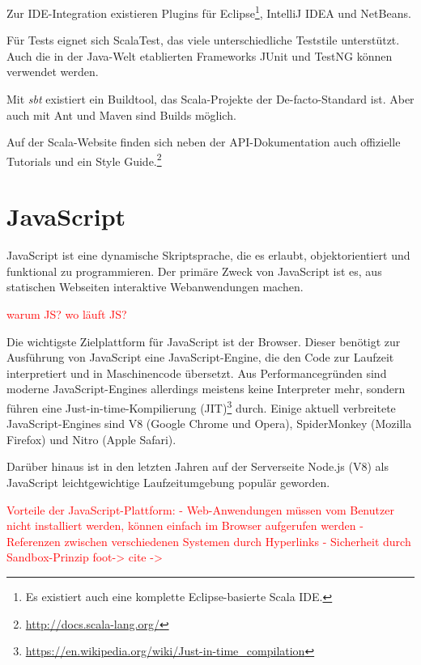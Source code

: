 \documentclass[a4paper, 12pt, hidelinks, listof=totoc, listoftables=totoc, bibliography=totoc]{scrreprt}
\newcommand{\TODO}[1]{\textcolor{red}{#1}\newline}
\begin{document}
Zur IDE-Integration existieren Plugins für Eclipse\footnote{Es existiert auch eine komplette Eclipse-basierte Scala IDE.}, IntelliJ IDEA und NetBeans.

Für Tests eignet sich ScalaTest, das viele unterschiedliche Teststile unterstützt. Auch die in der Java-Welt etablierten Frameworks JUnit und TestNG können verwendet werden.

Mit \textit{sbt} existiert ein Buildtool, das Scala-Projekte der De-facto-Standard ist. Aber auch mit Ant und Maven sind Builds möglich.

Auf der Scala-Website finden sich neben der API-Dokumentation auch offizielle Tutorials und ein Style Guide.\footnote{\url{http://docs.scala-lang.org/}}



\section{JavaScript}

JavaScript ist eine dynamische Skriptsprache, die es erlaubt, objektorientiert und funktional zu programmieren. Der primäre Zweck von JavaScript ist es, aus statischen Webseiten interaktive Webanwendungen machen\cite[S. 361]{flanagan2011.JDG}.

\TODO{warum JS?}
\TODO{wo läuft JS?}

Die wichtigste Zielplattform für JavaScript ist der Browser. Dieser benötigt zur Ausführung von JavaScript eine JavaScript-Engine, die den Code zur Laufzeit interpretiert und in Maschinencode übersetzt. Aus Performancegründen sind moderne JavaScript-Engines allerdings meistens keine Interpreter mehr, sondern führen eine Just-in-time-Kompilierung (JIT)\footnote{\url{https://en.wikipedia.org/wiki/Just-in-time_compilation}} durch. Einige aktuell verbreitete JavaScript-Engines sind V8 (Google Chrome und Opera), SpiderMonkey (Mozilla Firefox) und Nitro (Apple Safari).



Darüber hinaus ist in den letzten Jahren auf der Serverseite Node.js (V8) als JavaScript leichtgewichtige Laufzeitumgebung populär geworden.

\TODO{Vorteile der JavaScript-Plattform:}
\TODO{- Web-Anwendungen müssen vom Benutzer nicht installiert werden, können einfach im Browser aufgerufen werden}
\TODO{- Referenzen zwischen verschiedenen Systemen durch Hyperlinks}
\TODO{- Sicherheit durch Sandbox-Prinzip foot-> %
}
\TODO{cite -> %
}
\end{document}
